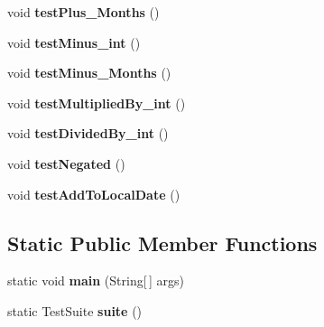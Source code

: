 \begin{DoxyCompactItemize}
\item 
\hypertarget{classorg_1_1joda_1_1time_1_1_test_months_a91cbb8655c8ffb2de986458312120438}{void {\bfseries test\-Plus\-\_\-\-Months} ()}\label{classorg_1_1joda_1_1time_1_1_test_months_a91cbb8655c8ffb2de986458312120438}

\item 
\hypertarget{classorg_1_1joda_1_1time_1_1_test_months_acb92ba20eb747e14a17940fe7d4c3606}{void {\bfseries test\-Minus\-\_\-int} ()}\label{classorg_1_1joda_1_1time_1_1_test_months_acb92ba20eb747e14a17940fe7d4c3606}

\item 
\hypertarget{classorg_1_1joda_1_1time_1_1_test_months_a4b6cda13848832ad0246ae49867151db}{void {\bfseries test\-Minus\-\_\-\-Months} ()}\label{classorg_1_1joda_1_1time_1_1_test_months_a4b6cda13848832ad0246ae49867151db}

\item 
\hypertarget{classorg_1_1joda_1_1time_1_1_test_months_a99ad40da95f2fb2d7a6b3387fb3da451}{void {\bfseries test\-Multiplied\-By\-\_\-int} ()}\label{classorg_1_1joda_1_1time_1_1_test_months_a99ad40da95f2fb2d7a6b3387fb3da451}

\item 
\hypertarget{classorg_1_1joda_1_1time_1_1_test_months_a6af7c57e849f70f1751a4aa560842c8a}{void {\bfseries test\-Divided\-By\-\_\-int} ()}\label{classorg_1_1joda_1_1time_1_1_test_months_a6af7c57e849f70f1751a4aa560842c8a}

\item 
\hypertarget{classorg_1_1joda_1_1time_1_1_test_months_a55bb67e0be9afd9782c4cfd5b58b7d90}{void {\bfseries test\-Negated} ()}\label{classorg_1_1joda_1_1time_1_1_test_months_a55bb67e0be9afd9782c4cfd5b58b7d90}

\item 
\hypertarget{classorg_1_1joda_1_1time_1_1_test_months_a1e550463c21fb49f25082900729e89ce}{void {\bfseries test\-Add\-To\-Local\-Date} ()}\label{classorg_1_1joda_1_1time_1_1_test_months_a1e550463c21fb49f25082900729e89ce}

\end{DoxyCompactItemize}
\subsection*{Static Public Member Functions}
\begin{DoxyCompactItemize}
\item 
\hypertarget{classorg_1_1joda_1_1time_1_1_test_months_a2fac4fd3e5c543a37488752e669a7d02}{static void {\bfseries main} (String\mbox{[}$\,$\mbox{]} args)}\label{classorg_1_1joda_1_1time_1_1_test_months_a2fac4fd3e5c543a37488752e669a7d02}

\item 
\hypertarget{classorg_1_1joda_1_1time_1_1_test_months_a3e4a4dda507a09c717f1ee231141b585}{static Test\-Suite {\bfseries suite} ()}\label{classorg_1_1joda_1_1time_1_1_test_months_a3e4a4dda507a09c717f1ee231141b585}

\end{DoxyCompactItemize}
